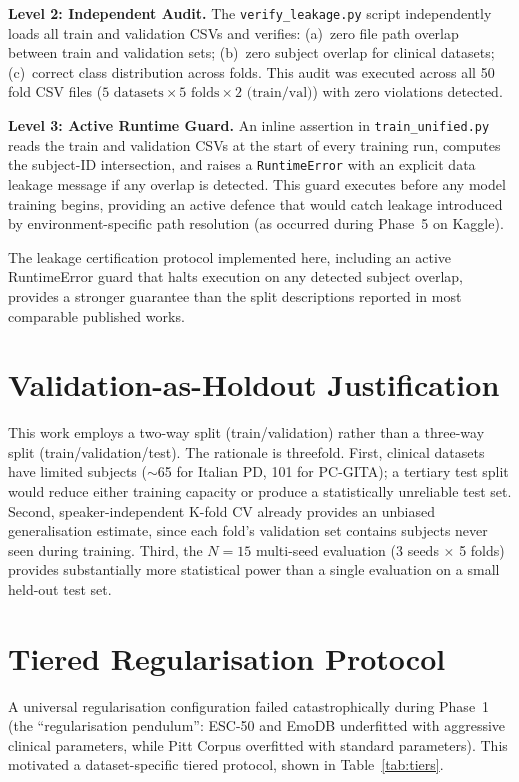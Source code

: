 \documentclass[oneside,openany]{final_report}
\begin{document}
\textbf{Level 2: Independent Audit.} The \texttt{verify\_leakage.py} script independently loads all train and validation CSVs and verifies: (a)~zero file path overlap between train and validation sets; (b)~zero subject overlap for clinical datasets; (c)~correct class distribution across folds. This audit was executed across all 50 fold CSV files ($5 \text{ datasets} \times 5 \text{ folds} \times 2 \text{ (train/val)}$) with zero violations detected.

\textbf{Level 3: Active Runtime Guard.} An inline assertion in \texttt{train\_unified.py} reads the train and validation CSVs at the start of every training run, computes the subject-ID intersection, and raises a \texttt{RuntimeError} with an explicit data leakage message if any overlap is detected. This guard executes before any model training begins, providing an active defence that would catch leakage introduced by environment-specific path resolution (as occurred during Phase~5 on Kaggle).

The leakage certification protocol implemented here, including an active RuntimeError guard that halts execution on any detected subject overlap, provides a stronger guarantee than the split descriptions reported in most comparable published works.

\section{Validation-as-Holdout Justification}

This work employs a two-way split (train/validation) rather than a three-way split (train/validation/test). The rationale is threefold. First, clinical datasets have limited subjects ($\sim$65 for Italian PD, 101 for PC-GITA); a tertiary test split would reduce either training capacity or produce a statistically unreliable test set. Second, speaker-independent K-fold CV already provides an unbiased generalisation estimate, since each fold's validation set contains subjects never seen during training. Third, the $N\!=\!15$ multi-seed evaluation (3 seeds $\times$ 5 folds) provides substantially more statistical power than a single evaluation on a small held-out test set.

\section{Tiered Regularisation Protocol}

A universal regularisation configuration failed catastrophically during Phase~1 (the ``regularisation pendulum'': ESC-50 and EmoDB underfitted with aggressive clinical parameters, while Pitt Corpus overfitted with standard parameters). This motivated a dataset-specific tiered protocol, shown in Table~\ref{tab:tiers}.
\end{document}
